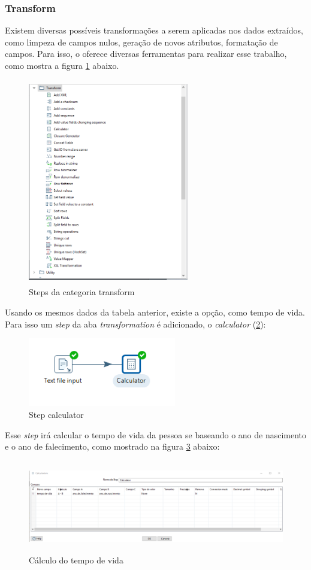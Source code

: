 \subsubsection{Transform}
Existem diversas possíveis transformações a serem aplicadas nos dados extraídos, como limpeza de campos nulos, geração de novos atributos, formatação de campos. Para isso, o \pdi oferece diversas ferramentas para realizar esse trabalho, como mostra a figura \ref{transformsteps} abaixo.
\begin{figure}[H]
\centering
\includegraphics[width=7cm, height=9cm]{imagens/transforms.png}
\caption{Steps da categoria transform}
\label{transformsteps}
\end{figure}
Usando os mesmos dados da tabela anterior, existe a opção, como tempo de vida. Para isso um \textit{step} da aba \textit{transformation} é adicionado, o \textit{calculator} (\ref{calculator}):
\begin{figure}[H]
\centering
\includegraphics[height=3cm]{imagens/calc.png}
\caption{Step calculator}
\label{calculator}
\end{figure}
Esse \textit{step} irá calcular o tempo de vida da pessoa se baseando o ano de nascimento e o ano de falecimento, como mostrado na figura \ref{timespan} abaixo:
\begin{figure}[H]
\centering
\includegraphics[height=4cm]{imagens/tempovida.png}
\caption{Cálculo do tempo de vida}
\label{timespan}
\end{figure}
